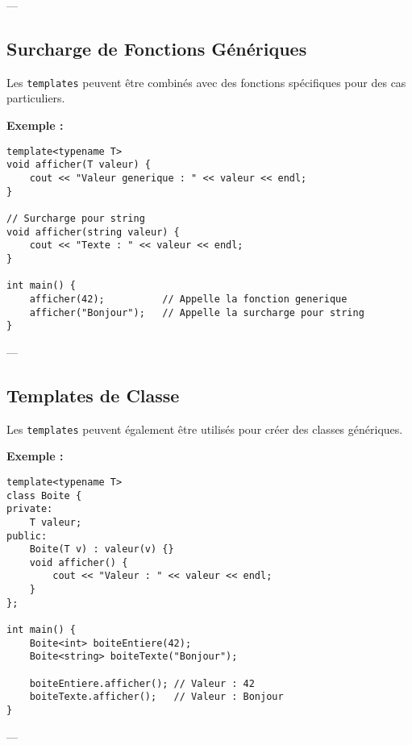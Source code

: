 ---

\subsection{ Surcharge de Fonctions Génériques}
Les \texttt{templates} peuvent être combinés avec des fonctions spécifiques pour des cas particuliers.

\textbf{Exemple :}
\begin{tcolorbox}[colframe=blue!50!black, colback=blue!5!white, title=Exemple de Surcharge de Template]
\begin{verbatim}
template<typename T>
void afficher(T valeur) {
    cout << "Valeur generique : " << valeur << endl;
}

// Surcharge pour string
void afficher(string valeur) {
    cout << "Texte : " << valeur << endl;
}

int main() {
    afficher(42);          // Appelle la fonction generique
    afficher("Bonjour");   // Appelle la surcharge pour string
}
\end{verbatim}
\end{tcolorbox}

---

\subsection{ Templates de Classe}
Les \texttt{templates} peuvent également être utilisés pour créer des classes génériques.

\textbf{Exemple :}
\begin{tcolorbox}[colframe=blue!50!black, colback=blue!5!white, title=Exemple de Template de Classe]
\begin{verbatim}
template<typename T>
class Boite {
private:
    T valeur;
public:
    Boite(T v) : valeur(v) {}
    void afficher() {
        cout << "Valeur : " << valeur << endl;
    }
};

int main() {
    Boite<int> boiteEntiere(42);
    Boite<string> boiteTexte("Bonjour");

    boiteEntiere.afficher(); // Valeur : 42
    boiteTexte.afficher();   // Valeur : Bonjour
}
\end{verbatim}
\end{tcolorbox}

---

